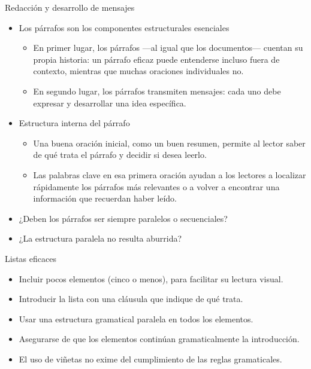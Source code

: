 \documentclass{beamer}
\begin{document}
\begin{frame}{Redacción y desarrollo de mensajes}
\begin{itemize}
  \item Los párrafos son los componentes estructurales esenciales 
  \begin{itemize}
      \item En primer lugar, los párrafos —al igual que los documentos— cuentan su propia historia: un párrafo eficaz puede entenderse incluso fuera de contexto, mientras que muchas oraciones individuales no.
      \item En segundo lugar, los párrafos transmiten mensajes: cada uno debe expresar y desarrollar una idea específica.

  \end{itemize}
  \item Estructura interna del párrafo
  \begin{itemize}
      \item Una buena oración inicial, como un buen resumen, permite al lector saber de qué trata el párrafo y decidir si desea leerlo.
      \item Las palabras clave en esa primera oración ayudan a los lectores a localizar rápidamente los párrafos más relevantes o a volver a encontrar una información que recuerdan haber leído.

  \end{itemize}
  \item ¿Deben los párrafos ser siempre paralelos o secuenciales?
  \item ¿La estructura paralela no resulta aburrida?
\end{itemize}
\end{frame}

\begin{frame}{Listas eficaces}
\begin{itemize}
  \item Incluir pocos elementos (cinco o menos), para facilitar su lectura visual.
  \item Introducir la lista con una cláusula que indique de qué trata.
  \item Usar una estructura gramatical paralela en todos los elementos.
  \item Asegurarse de que los elementos continúan gramaticalmente la introducción.
  \item El uso de viñetas no exime del cumplimiento de las reglas gramaticales.

\end{itemize}
\end{frame}
\end{document}
